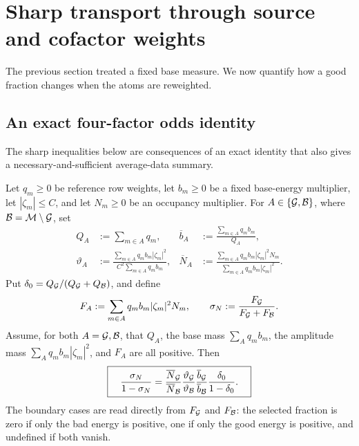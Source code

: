 \section{Sharp transport through source and cofactor weights}
\label{sec:occupancy}

The previous section treated a fixed base measure.  We now quantify how a
good fraction changes when the atoms are reweighted.

\subsection{An exact four-factor odds identity}

The sharp inequalities below are consequences of an exact identity that
also gives a necessary-and-sufficient average-data summary.

\begin{theorem}
\label{thm:tpc54-exact-odds-factorization}
Let \(q_m\ge0\) be reference row weights, let \(b_m\ge0\) be a fixed
base-energy multiplier, let \(|\zeta_m|\le C\), and let \(N_m\ge0\) be
an occupancy multiplier.  For \(A\in\{\mathcal G,\mathcal B\}\), where
\(\mathcal B=\mathcal M\setminus\mathcal G\), set
\begin{align}
 Q_A&:=\sum_{m\in A}q_m,
 &\overline b_A&:=\frac{\sum_{m\in A}q_mb_m}{Q_A},
 \nonumber\\
 \vartheta_A&:=
 \frac{\sum_{m\in A}q_mb_m|\zeta_m|^2}
      {C^2\sum_{m\in A}q_mb_m},
 &\overline N_A&:=
 \frac{\sum_{m\in A}q_mb_m|\zeta_m|^2N_m}
      {\sum_{m\in A}q_mb_m|\zeta_m|^2}.
 \label{eq:tpc54-factor-averages}
\end{align}
Put \(\delta_0=Q_{\mathcal G}/(Q_{\mathcal G}+Q_{\mathcal B})\), and define
\[
 F_A:=\sum_{m\in A}q_mb_m|\zeta_m|^2N_m,
 \qquad \sigma_N:=\frac{F_{\mathcal G}}{F_{\mathcal G}+F_{\mathcal B}}.
\]
Assume, for both \(A=\mathcal G,\mathcal B\), that \(Q_A\), the base mass
\(\sum_Aq_mb_m\), the amplitude mass
\(\sum_Aq_mb_m|\zeta_m|^2\), and \(F_A\) are all positive.  Then
\begin{equation}
 \boxed{\quad
 \frac{\sigma_N}{1-\sigma_N}
 =\frac{\overline N_{\mathcal G}}{\overline N_{\mathcal B}}
  \frac{\vartheta_{\mathcal G}}{\vartheta_{\mathcal B}}
  \frac{\overline b_{\mathcal G}}{\overline b_{\mathcal B}}
  \frac{\delta_0}{1-\delta_0}.
 \quad}
 \label{eq:tpc54-exact-odds-factorization}
\end{equation}
The boundary cases are read directly from \(F_{\mathcal G}\) and
\(F_{\mathcal B}\): the selected fraction is zero if only the bad energy is
positive, one if only the good energy is positive, and undefined if both
vanish.
\end{theorem}

